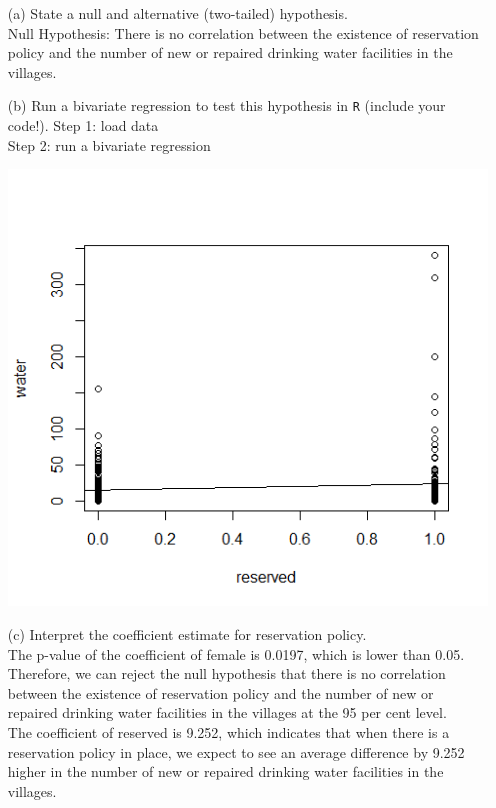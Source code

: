 \documentclass[12pt,letterpaper]{article}
\begin{document}
\newpage
\begin{enumerate}
	\item [(a)] State a null and alternative (two-tailed) hypothesis. \\
	Null Hypothesis: There is no correlation between the existence of reservation policy and the number of new or repaired drinking water facilities in the villages. \\
	\vspace{6cm}
	\item [(b)] Run a bivariate regression to test this hypothesis in \texttt{R} (include your code!).
	Step 1: load data\\
	
	Step 2: run a bivariate regression
		
	\includegraphics[width=1.1\textwidth]{Water ~ Reserved, plot.png}

	
	\item [(c)] Interpret the coefficient estimate for reservation policy.\\ 
	The p-value of the coefficient of female is 0.0197, which is lower than 0.05.
	Therefore, we can reject the null hypothesis that there is no correlation between the existence of reservation policy and the number of new or repaired drinking water facilities in the villages at the 95 per cent level.\\ 
	The coefficient of reserved is 9.252, which indicates that when there is a reservation policy in place, we expect to see an average difference by 9.252 higher in the number of new or repaired drinking water facilities in the villages.
\end{enumerate}
\end{document}
